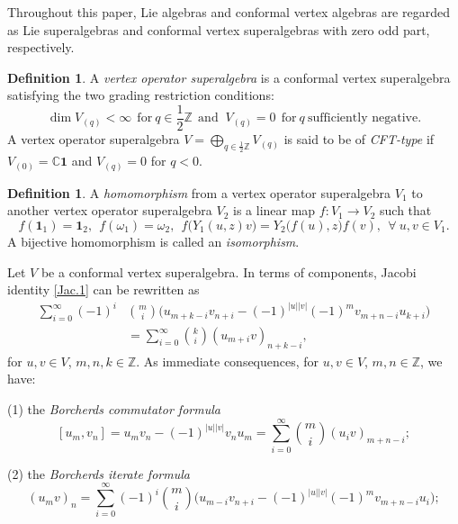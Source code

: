 \documentclass[12pt]{article}
\numberwithin{equation}{section}
\theoremstyle{definition}
\newtheorem{definition}[theorem]{Definition}
\theoremstyle{plain}
\newcommand{\bC}{\ensuremath{\mathbb{C}}}
\newcommand{\bZ}{\ensuremath{\mathbb{Z}}}
\newcommand{\subno}[1]{\noindent\textnormal{(#1)}}
\newcommand{\bone}{\mathbf{1 }}
\begin{document}
Throughout this paper, Lie algebras and conformal vertex algebras are regarded as Lie superalgebras and conformal vertex superalgebras with zero odd part, respectively.

\begin{definition}
    A \emph{vertex operator superalgebra} is a conformal vertex superalgebra satisfying the two grading restriction conditions:
    \begin{equation*}
        \dim V_{(q)}<\infty\ \ \text{for}\ q\in\frac{1}{2}\bZ\ \ \text{and }\ V_{(q)}=0\ \ \text{for}\ q\ \text{sufficiently negative}.
    \end{equation*}
    A vertex operator superalgebra $V=\bigoplus_{q\in\frac12\bZ}V_{(q)}$ is said to be of \emph{CFT-type} if $V_{(0)}=\bC\bone$ and $V_{(q)}=0$ for $q<0$.
\end{definition}


\begin{definition}
    A \emph{homomorphism} from a vertex operator superalgebra $V_1$ to another vertex operator superalgebra $V_2$ is a linear map $f:V_1\rightarrow V_2$ such that
    \begin{equation*}
        f(\bone_1)=\bone_2,\ \ f(\omega_1)=\omega_2,\ \  f\big(Y_1(u,z)v\big)=Y_2\big(f(u),z\big)f(v),\ \ \forall\ u,v\in V_1.
    \end{equation*}
    A bijective homomorphism is called an \emph{isomorphism}. 
\end{definition}

Let $V$ be a conformal vertex superalgebra. In terms of components, Jacobi identity \eqref{Jac.1} can be rewritten as
\begin{align*}
    \sum_{i=0}^\infty(-1)^i&\binom{m}{i}\big(u_{m+k-i}v_{n+i}-(-1)^{|u||v|}(-1)^mv_{m+n-i}u_{k+i}\big)\\
    &=\sum_{i=0}^\infty\binom{k}{i}(u_{m+i}v)_{n+k-i},
\end{align*}
for $u,v\in V$, $m,n,k\in\bZ$. As immediate consequences, for $u,v\in V$, $m,n\in\bZ$, we have:

\subno{1} the \emph{Borcherds commutator formula}
\begin{equation}\label{comm}
    [u_m,v_n]=u_mv_n-(-1)^{|u||v|}v_nu_m=\sum_{i=0}^\infty\binom{m}{i}(u_iv)_{m+n-i};
\end{equation}

\subno{2} the \emph{Borcherds iterate formula}
\begin{equation}\label{iter}
    (u_mv)_n=\sum_{i=0}^\infty(-1)^i\binom{m}{i}\big(u_{m-i}v_{n+i}-(-1)^{|u||v|}(-1)^mv_{m+n-i}u_i\big);
\end{equation}
\end{document}
